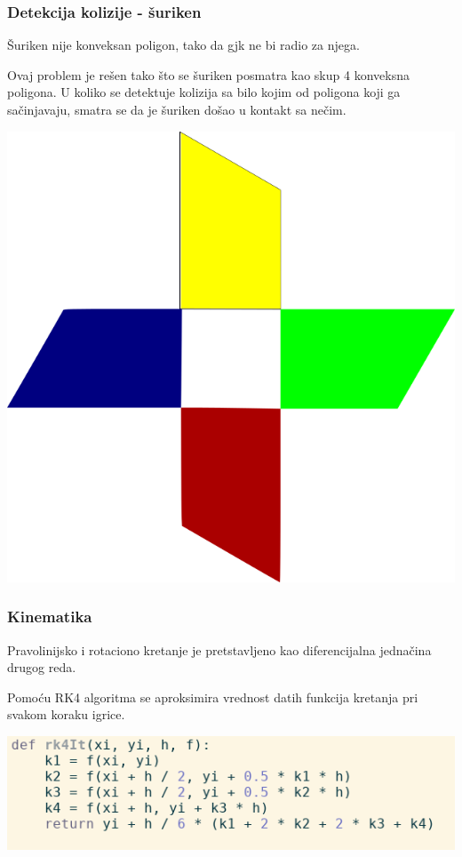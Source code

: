 \documentclass{beamer}
\begin{document}
\begin{frame}
	\frametitle{Detekcija kolizije - šuriken}
	Šuriken nije konveksan poligon, tako da gjk ne bi radio za njega.

	Ovaj problem je rešen tako što se šuriken posmatra kao skup 4 konveksna poligona. U koliko se detektuje kolizija sa bilo kojim od poligona koji ga sačinjavaju, smatra se da je šuriken došao u kontakt sa nečim.
	
	\vspace{0.4cm}
	\begin{center}
		\includegraphics[scale=0.3]{./images/shuriken.png}
	\end{center}
\end{frame}

\begin{frame}
	\frametitle{Kinematika}
	Pravolinijsko i rotaciono kretanje je pretstavljeno kao diferencijalna jednačina drugog reda.
	
	Pomoću RK4 algoritma se aproksimira vrednost datih funkcija kretanja pri svakom koraku igrice.
	
	\vspace{0.8cm}
	\begin{center}
		\includegraphics[scale=0.5]{./images/rk4.png}
	\end{center}
\end{frame}
\end{document}
